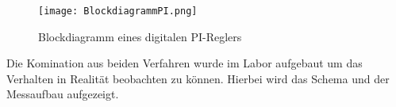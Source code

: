 \begin{figure}[ht!]
	\centering
	\texttt{[image: BlockdiagrammPI.png]}	
	\caption{Blockdiagramm eines digitalen PI-Reglers}\label{fig:PIRegler}
\end{figure}

Die Komination aus beiden Verfahren wurde im Labor aufgebaut um das Verhalten in Realität beobachten zu können. Hierbei wird das Schema und der Messaufbau aufgezeigt. 






